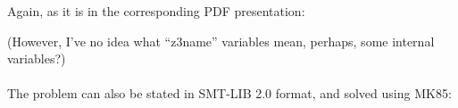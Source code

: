 Again, as it is in the corresponding PDF presentation:

\begin{figure}[H]
\centering
{}
\end{figure}

(However, I've no idea what ``z3name'' variables mean, perhaps, some internal variables?)\\
\\
The problem can also be stated in SMT-LIB 2.0 format, and solved using MK85:





